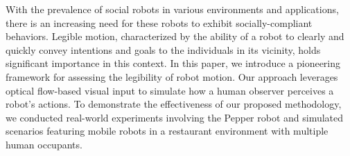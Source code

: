 With the prevalence of social robots in various environments and applications, there is an increasing need for these robots to exhibit socially-compliant behaviors. Legible motion, characterized by the ability of a robot to clearly and quickly convey intentions and goals to the individuals in its vicinity, holds significant importance in this context.
In this paper, we introduce a pioneering framework for assessing the legibility of robot motion.
Our approach leverages optical flow-based visual input to simulate how a human observer perceives a robot's actions. To demonstrate the effectiveness of our proposed methodology, we conducted real-world experiments involving the Pepper robot and simulated scenarios featuring mobile robots in a restaurant environment with multiple human occupants.